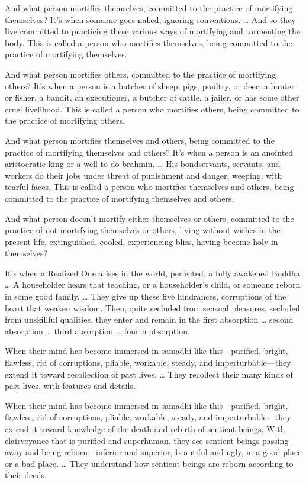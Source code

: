 \documentclass[12pt,openany]{book}%
\begin{document}
And what person mortifies themselves, committed to the practice of mortifying themselves? It’s when someone goes naked, ignoring conventions. … And so they live committed to practicing these various ways of mortifying and tormenting the body. This is called a person who mortifies themselves, being committed to the practice of mortifying themselves. 

And what person mortifies others, committed to the practice of mortifying others? It’s when a person is a butcher of sheep, pigs, poultry, or deer, a hunter or fisher, a bandit, an executioner, a butcher of cattle, a jailer, or has some other cruel livelihood. This is called a person who mortifies others, being committed to the practice of mortifying others. 

And what person mortifies themselves and others, being committed to the practice of mortifying themselves and others? It’s when a person is an anointed aristocratic king or a well-to-do brahmin. … His bondservants, servants, and workers do their jobs under threat of punishment and danger, weeping, with tearful faces. This is called a person who mortifies themselves and others, being committed to the practice of mortifying themselves and others. 

And what person doesn’t mortify either themselves or others, committed to the practice of not mortifying themselves or others, living without wishes in the present life, extinguished, cooled, experiencing bliss, having become holy in themselves? 

It’s when a Realized One arises in the world, perfected, a fully awakened Buddha … A householder hears that teaching, or a householder’s child, or someone reborn in some good family. … They give up these five hindrances, corruptions of the heart that weaken wisdom. Then, quite secluded from sensual pleasures, secluded from unskillful qualities, they enter and remain in the first absorption … second absorption … third absorption … fourth absorption. 

When their mind has become immersed in \textsanskrit{samādhi} like this—purified, bright, flawless, rid of corruptions, pliable, workable, steady, and imperturbable—they extend it toward recollection of past lives. … They recollect their many kinds of past lives, with features and details. 

When their mind has become immersed in \textsanskrit{samādhi} like this—purified, bright, flawless, rid of corruptions, pliable, workable, steady, and imperturbable—they extend it toward knowledge of the death and rebirth of sentient beings. With clairvoyance that is purified and superhuman, they see sentient beings passing away and being reborn—inferior and superior, beautiful and ugly, in a good place or a bad place. … They understand how sentient beings are reborn according to their deeds. 
\end{document}
